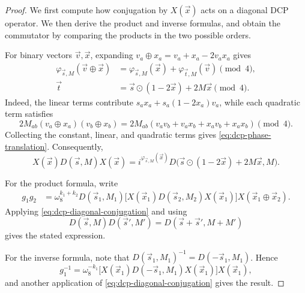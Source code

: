 \begin{proof}
We first compute how conjugation by $X(\vec{x})$ acts on
a diagonal DCP operator. We then derive the product and
inverse formulas, and obtain the commutator by comparing
the products in the two possible orders.

For binary vectors $\vec{v},\vec{x}$, expanding
$v_a\oplus x_a=v_a+x_a-2v_ax_a$ gives
\begin{align}
    \varphi_{\vec{s},M}(\vec{v}\oplus\vec{x})
    &=
    \varphi_{\vec{s},M}(\vec{x})
    +\varphi_{\vec{t},M}(\vec{v})
    \pmod 4,
    \label{eq:dcp-phase-translation}
    \\
    \vec{t}
    &=
    \vec{s}\odot(1-2\vec{x})+2M\vec{x}
    \pmod 4.
\end{align}
Indeed, the linear terms contribute
$s_a x_a+s_a(1-2x_a)v_a$, while each quadratic term
satisfies
\[
    2M_{ab}(v_a\oplus x_a)(v_b\oplus x_b)
    =
    2M_{ab}
    (v_av_b+v_ax_b+x_av_b+x_ax_b)
    \pmod 4.
\]
Collecting the constant, linear, and quadratic terms gives
\cref{eq:dcp-phase-translation}. Consequently,
\begin{equation}
    X(\vec{x})D(\vec{s},M)X(\vec{x})
    =
    i^{\varphi_{\vec{s},M}(\vec{x})}
    D\big(
        \vec{s}\odot(1-2\vec{x})+2M\vec{x},M
    \big).
    \label{eq:dcp-diagonal-conjugation}
\end{equation}

For the product formula, write
\begin{align*}
    g_1g_2
    &=
    \omega_8^{k_1+k_2}
    D(\vec{s}_1,M_1)
    \big[
        X(\vec{x}_1)D(\vec{s}_2,M_2)X(\vec{x}_1)
    \big]
    X(\vec{x}_1\oplus\vec{x}_2).
\end{align*}
Applying \cref{eq:dcp-diagonal-conjugation} and using
\[
    D(\vec{s},M)D(\vec{s}',M')
    =
    D(\vec{s}+\vec{s}',M+M')
\]
gives the stated expression.

For the inverse formula, note that
$D(\vec{s}_1,M_1)^{-1}=D(-\vec{s}_1,M_1)$. Hence
\[
    g_1^{-1}
    =
    \omega_8^{-k_1}
    \big[
        X(\vec{x}_1)D(-\vec{s}_1,M_1)X(\vec{x}_1)
    \big]
    X(\vec{x}_1),
\]
and another application of
\cref{eq:dcp-diagonal-conjugation} gives the result.


\end{proof}
